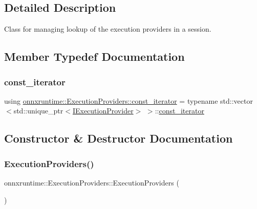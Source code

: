 \subsection{Detailed Description}
Class for managing lookup of the execution providers in a session. 

\subsection{Member Typedef Documentation}
\mbox{\label{classonnxruntime_1_1ExecutionProviders_a2eb06c44e805e428aa26b1bfe12348fb}} 
\subsubsection{\texorpdfstring{const\+\_\+iterator}{const\_iterator}}
{\footnotesize\ttfamily using \mbox{\hyperlink{classonnxruntime_1_1ExecutionProviders_a2eb06c44e805e428aa26b1bfe12348fb}{onnxruntime\+::\+Execution\+Providers\+::const\+\_\+iterator}} =  typename std\+::vector$<$std\+::unique\+\_\+ptr$<$\mbox{\hyperlink{classonnxruntime_1_1IExecutionProvider}{I\+Execution\+Provider}}$>$ $>$\+::\mbox{\hyperlink{classonnxruntime_1_1ExecutionProviders_a2eb06c44e805e428aa26b1bfe12348fb}{const\+\_\+iterator}}}



\subsection{Constructor \& Destructor Documentation}
\mbox{\label{classonnxruntime_1_1ExecutionProviders_a52b3a1bd0ae86e36699450a2c79f2775}} 
\subsubsection{\texorpdfstring{Execution\+Providers()}{ExecutionProviders()}}
{\footnotesize\ttfamily onnxruntime\+::\+Execution\+Providers\+::\+Execution\+Providers (\begin{DoxyParamCaption}{ }\end{DoxyParamCaption})\hspace{0.3cm}{\ttfamily [default]}}



